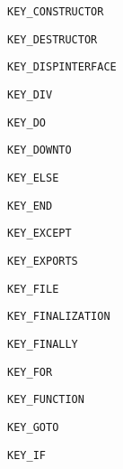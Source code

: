 \documentclass{report}
\begin{document}
\begin{list}{}
\begin{description}
\item[\texttt{KEY{\_}CONSTRUCTOR}] \label{PasDoc_Tokenizer-KEY_CONSTRUCTOR}
\index{}
 
\item[\texttt{KEY{\_}DESTRUCTOR}] \label{PasDoc_Tokenizer-KEY_DESTRUCTOR}
\index{}
 
\item[\texttt{KEY{\_}DISPINTERFACE}] \label{PasDoc_Tokenizer-KEY_DISPINTERFACE}
\index{}
 
\item[\texttt{KEY{\_}DIV}] \label{PasDoc_Tokenizer-KEY_DIV}
\index{}
 
\item[\texttt{KEY{\_}DO}] \label{PasDoc_Tokenizer-KEY_DO}
\index{}
 
\item[\texttt{KEY{\_}DOWNTO}] \label{PasDoc_Tokenizer-KEY_DOWNTO}
\index{}
 
\item[\texttt{KEY{\_}ELSE}] \label{PasDoc_Tokenizer-KEY_ELSE}
\index{}
 
\item[\texttt{KEY{\_}END}] \label{PasDoc_Tokenizer-KEY_END}
\index{}
 
\item[\texttt{KEY{\_}EXCEPT}] \label{PasDoc_Tokenizer-KEY_EXCEPT}
\index{}
 
\item[\texttt{KEY{\_}EXPORTS}] \label{PasDoc_Tokenizer-KEY_EXPORTS}
\index{}
 
\item[\texttt{KEY{\_}FILE}] \label{PasDoc_Tokenizer-KEY_FILE}
\index{}
 
\item[\texttt{KEY{\_}FINALIZATION}] \label{PasDoc_Tokenizer-KEY_FINALIZATION}
\index{}
 
\item[\texttt{KEY{\_}FINALLY}] \label{PasDoc_Tokenizer-KEY_FINALLY}
\index{}
 
\item[\texttt{KEY{\_}FOR}] \label{PasDoc_Tokenizer-KEY_FOR}
\index{}
 
\item[\texttt{KEY{\_}FUNCTION}] \label{PasDoc_Tokenizer-KEY_FUNCTION}
\index{}
 
\item[\texttt{KEY{\_}GOTO}] \label{PasDoc_Tokenizer-KEY_GOTO}
\index{}
 
\item[\texttt{KEY{\_}IF}] \label{PasDoc_Tokenizer-KEY_IF}
\index{}
 

\end{description}
\end{list}
\end{document}
